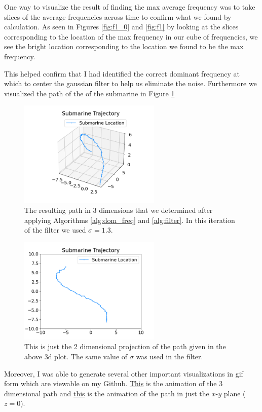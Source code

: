 \documentclass[11pt]{amsart}
\begin{document}
One way to visualize the result of finding the max average frequency was to take slices of the average frequencies across time to confirm what we found by calculation.
As seen in Figures \ref{fig:f1_0} and \ref{fig:f1} by looking at the slices corresponding to the location of the max frequency in our cube of frequencies, we see the bright location corresponding to the location we found to be the max frequency.

This helped confirm that I had identified the correct dominant frequency at which to center the gaussian filter to help us eliminate the noise.
Furthermore we visualized the path of the of the submarine in Figure \ref{fig:f2}

\begin{figure}[h]
	\centering
	\includegraphics[height=2in]{../visualizations/submarine_static_3d.png}
 	\caption{The resulting path in 3 dimensions that we determined after applying Algorithms \ref{alg:dom_freq} and \ref{alg:filter}. In this iteration of the filter we used $\sigma=1.3$.}\label{fig:f2}
\end{figure}

\begin{figure}[h]
	\centering
	\includegraphics[height=2in]{../visualizations/submarine_static_2d.png}
 	\caption{This is just the 2 dimensional projection of the path given in the above 3d plot. The same value of $\sigma$ was used in the filter.}\label{fig:f3}
\end{figure}

Moreover, I was able to generate several other important visualizations in gif form which are viewable on my Github.
\href{https://github.com/hunter-lybbert/uw-central/blob/data-analysis-hw-1/data_analysis/hw_01/visualizations/submarine_trajectory_3d.gif}{This} is the animation of the 3 dimensional path and \href{https://github.com/hunter-lybbert/uw-central/blob/data-analysis-hw-1/data_analysis/hw_01/visualizations/submarine_trajectory_2d.gif}{this} is the animation of the path in just the $x$-$y$ plane ($z = 0$).
\end{document}
